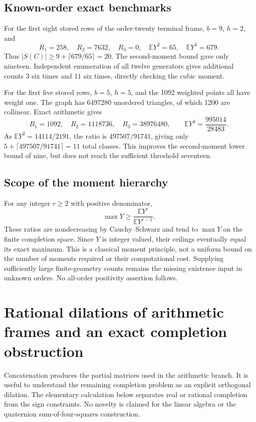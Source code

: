 \documentclass[11pt]{article}
\begin{document}
\subsection{Known-order exact benchmarks}
For the first eight stored rows of the order-twenty terminal frame,
$b=9$, $h=2$, and
\[
 R_1=258,\quad R_2=7632,\quad R_3=0,\quad
 \mathbb EY^2=65,\quad\mathbb EY^3=679.
\]
Thus $|S(C)|\ge9+\lceil679/65\rceil=20$.
The second-moment bound gave only nineteen. Independent enumeration
of all twelve generators gives additional counts $3$ six times and
$11$ six times, directly checking the cubic moment.

For the first five stored rows, $b=5$, $h=5$, and the 1092 weighted
points all have weight one. The graph has 6497280 unordered triangles,
of which 1200 are collinear. Exact arithmetic gives
\[
 R_1=1092,\quad R_2=1118736,\quad R_3=38976480,
 \qquad\mathbb EY^3=\frac{995014}{28483}.
\]
As $\mathbb EY^2=14114/2191$, the ratio is
$497507/91741$, giving only $5+\lceil497507/91741\rceil=11$
total classes. This improves the second-moment lower bound of nine,
but does not reach the sufficient threshold seventeen.

\subsection{Scope of the moment hierarchy}
For any integer $r\ge2$ with positive denominator,
\[
 \max Y\ge\frac{\mathbb EY^r}{\mathbb EY^{r-1}}.
\]
These ratios are nondecreasing by Cauchy--Schwarz and tend to
$\max Y$ on the finite completion space. Since $Y$ is integer valued,
their ceilings eventually equal its exact maximum. This is a
classical moment principle, not a uniform bound on the number of
moments required or their computational cost. Supplying sufficiently
large finite-geometry counts remains the missing existence input in
unknown orders. No all-order positivity assertion follows.
\section{Rational dilations of arithmetic frames and an exact completion obstruction}
\label{sec:rational-dilations}

Concatenation produces the partial matrices used in the arithmetic
branch. It is useful to understand the remaining completion problem
as an explicit orthogonal dilation. The elementary calculation below
separates real or rational completion from the sign constraints.
No novelty is claimed for the linear algebra or the quaternion
sum-of-four-squares construction.
\end{document}
